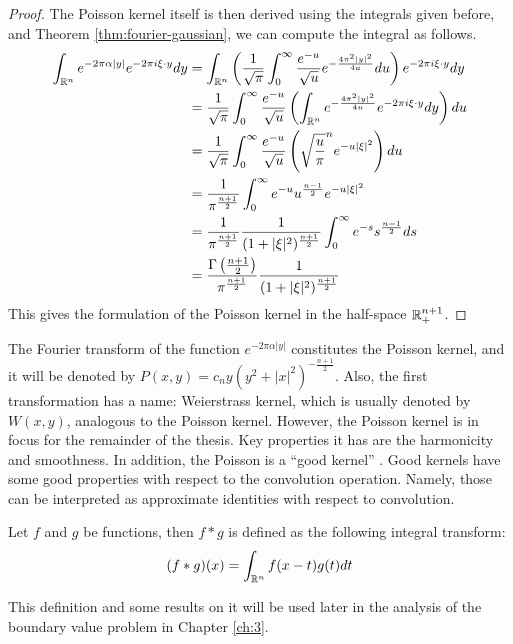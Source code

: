 \begin{proof}
    The Poisson kernel itself is then derived using the integrals given before, and Theorem \ref{thm:fourier-gaussian}, we can compute the integral as follows.
    \begin{align*}
        \int_{\mathbb R^{n}}e^{-2\pi\alpha|y|}e^{-2\pi i \xi\cdot y}dy&=\int_{\mathbb R^n}\left(\frac{1}{\sqrt{\pi}}\int_0^\infty \frac{e^{-u}}{\sqrt{u}}e^{-\frac{4\pi^2|y|^2}{4u}}du\right)e^{-2\pi i \xi\cdot y}dy \\
        &=\frac{1}{\sqrt{\pi}}\int_0^\infty\frac{e^{-u}}{\sqrt{u}}\left(\int_{\mathbb R^n} e^{-\frac{4\pi^2|y|^2}{4u}}e^{-2\pi i \xi\cdot y}dy\right)du \\
        &=\frac{1}{\sqrt{\pi}}\int_0^\infty\frac{e^{-u}}{\sqrt{u}}\left(\sqrt{\frac{u}{\pi}}^ne^{-u|\xi|^2}\right)du \\
        &=\frac{1}{\pi^{\frac{n+1}{2}}}\int_0^\infty e^{-u}u^{\frac{n-1}{2}}e^{-u|\xi|^2} \\
        &=\frac{1}{\pi^{\frac{n+1}{2}}}\frac{1}{(1+|\xi|^2)^{\frac{n+1}{2}}}\int_0^\infty e^{-s}s^{\frac{n-1}{2}}ds \\
        &=\frac{\Gamma\left(\frac{n+1}{2}\right)}{\pi^{\frac{n+1}{2}}}\frac{1}{(1+|\xi|^2)^{\frac{n+1}{2}}}
    \end{align*}
    This gives the formulation of the Poisson kernel in the half-space $\mathbb R_+^{n+1}$.
\end{proof}

The Fourier transform of the function $e^{-2\pi\alpha|y|}$ constitutes the Poisson kernel, and it will be denoted by $P(x,y)=c_ny(y^2+|x|^2)^{-\frac{n+1}{2}}$. Also, the first transformation has a name: Weierstrass kernel, which is usually denoted by $W(x,y)$, analogous to the Poisson kernel. However, the Poisson kernel is in focus for the remainder of the thesis. Key properties it has are the harmonicity and smoothness. In addition, the Poisson is a ``good kernel'' \cite{SteinShack1}. Good kernels have some good properties with respect to the convolution operation. Namely, those can be interpreted as approximate identities with respect to convolution.

\begin{definition}[Convolution]
    Let $f$ and $g$ be functions, then $f*g$ is defined as the following integral transform:
    \begin{equation*}
        (f*g)(x)=\int_{\mathbb R^n}f(x-t)g(t)dt
    \end{equation*}
\end{definition}
This definition and some results on it will be used later in the analysis of the boundary value problem in Chapter \ref{ch:3}.

